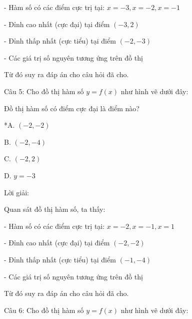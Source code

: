\documentclass[a4paper,12pt]{article}
\begin{document}
- Hàm số có các điểm cực trị tại: \(x = -3, x = -2, x = -1\)

- Đỉnh cao nhất (cực đại) tại điểm \((-3, 2)\)

- Đỉnh thấp nhất (cực tiểu) tại điểm \((-2, -3)\)

- Các giá trị số nguyên tương ứng trên đồ thị

Từ đó suy ra đáp án cho câu hỏi đã cho.




Câu 5: Cho đồ thị hàm số \(y=f(x)\) như hình vẽ dưới đây:




Đồ thị hàm số có điểm cực đại là điểm nào?

*A. \((-2,-2)\)

B. \((-2,-4)\)

C. \((-2,2)\)

D. \(y=-3\)

Lời giải:


            Quan sát đồ thị hàm số, ta thấy:

- Hàm số có các điểm cực trị tại: \(x = -2, x = -1, x = 1\)

- Đỉnh cao nhất (cực đại) tại điểm \((-2, -2)\)

- Đỉnh thấp nhất (cực tiểu) tại điểm \((-1, -4)\)

- Các giá trị số nguyên tương ứng trên đồ thị

Từ đó suy ra đáp án cho câu hỏi đã cho.




Câu 6: Cho đồ thị hàm số \(y=f(x)\) như hình vẽ dưới đây:
\end{document}
